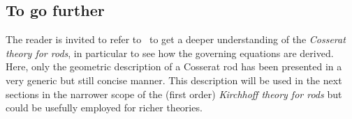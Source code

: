 \subsection{To go further}

The reader is invited to refer to~\cite{Antman2005} to get a deeper understanding of the \emph{Cosserat theory for rods}, in particular to see how the governing equations are derived. Here, only the geometric description of a Cosserat rod has been presented in a very generic but still concise manner. This description will be used in the next sections in the narrower scope of the (first order) \emph{Kirchhoff theory for rods} but could be usefully employed for richer theories. 



